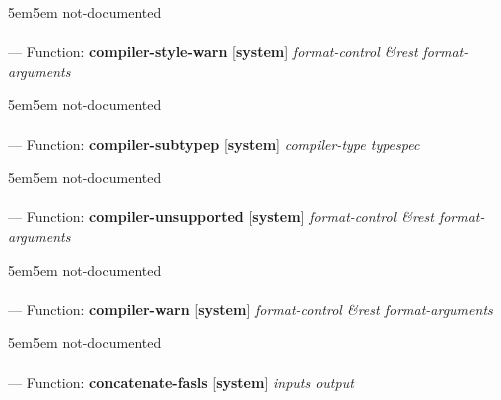 \begin{adjustwidth}{5em}{5em}
not-documented
\end{adjustwidth}

\paragraph{}
\label{SYSTEM:COMPILER-STYLE-WARN}
--- Function: \textbf{compiler-style-warn} [\textbf{system}] \textit{format-control \&rest format-arguments}

\begin{adjustwidth}{5em}{5em}
not-documented
\end{adjustwidth}

\paragraph{}
\label{SYSTEM:COMPILER-SUBTYPEP}
--- Function: \textbf{compiler-subtypep} [\textbf{system}] \textit{compiler-type typespec}

\begin{adjustwidth}{5em}{5em}
not-documented
\end{adjustwidth}

\paragraph{}
\label{SYSTEM:COMPILER-UNSUPPORTED}
--- Function: \textbf{compiler-unsupported} [\textbf{system}] \textit{format-control \&rest format-arguments}

\begin{adjustwidth}{5em}{5em}
not-documented
\end{adjustwidth}

\paragraph{}
\label{SYSTEM:COMPILER-WARN}
--- Function: \textbf{compiler-warn} [\textbf{system}] \textit{format-control \&rest format-arguments}

\begin{adjustwidth}{5em}{5em}
not-documented
\end{adjustwidth}

\paragraph{}
\label{SYSTEM:CONCATENATE-FASLS}
--- Function: \textbf{concatenate-fasls} [\textbf{system}] \textit{inputs output}

